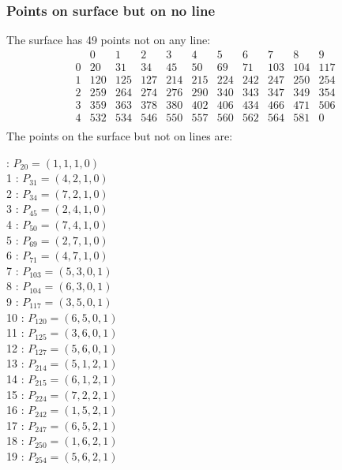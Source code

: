 \documentclass{article}
\begin{document}
{\subsubsection*{Points on surface but on no line}
The surface has 49 points not on any line:\\
$$
\begin{array}{r|*{10}{r}}
 & 0 & 1 & 2 & 3 & 4 & 5 & 6 & 7 & 8 & 9\\
\hline
0 & 20 & 31 & 34 & 45 & 50 & 69 & 71 & 103 & 104 & 117\\
1 & 120 & 125 & 127 & 214 & 215 & 224 & 242 & 247 & 250 & 254\\
2 & 259 & 264 & 274 & 276 & 290 & 340 & 343 & 347 & 349 & 354\\
3 & 359 & 363 & 378 & 380 & 402 & 406 & 434 & 466 & 471 & 506\\
4 & 532 & 534 & 546 & 550 & 557 & 560 & 562 & 564 & 581 & 0\\
\end{array}
$$
The points on the surface but not on lines are:\\
\begin{multicols}{2}
 : $P_{20}=( 1, 1, 1, 0 )$\\
1 : $P_{31}=( 4, 2, 1, 0 )$\\
2 : $P_{34}=( 7, 2, 1, 0 )$\\
3 : $P_{45}=( 2, 4, 1, 0 )$\\
4 : $P_{50}=( 7, 4, 1, 0 )$\\
5 : $P_{69}=( 2, 7, 1, 0 )$\\
6 : $P_{71}=( 4, 7, 1, 0 )$\\
7 : $P_{103}=( 5, 3, 0, 1 )$\\
8 : $P_{104}=( 6, 3, 0, 1 )$\\
9 : $P_{117}=( 3, 5, 0, 1 )$\\
10 : $P_{120}=( 6, 5, 0, 1 )$\\
11 : $P_{125}=( 3, 6, 0, 1 )$\\
12 : $P_{127}=( 5, 6, 0, 1 )$\\
13 : $P_{214}=( 5, 1, 2, 1 )$\\
14 : $P_{215}=( 6, 1, 2, 1 )$\\
15 : $P_{224}=( 7, 2, 2, 1 )$\\
16 : $P_{242}=( 1, 5, 2, 1 )$\\
17 : $P_{247}=( 6, 5, 2, 1 )$\\
18 : $P_{250}=( 1, 6, 2, 1 )$\\
19 : $P_{254}=( 5, 6, 2, 1 )$\\

\end{multicols}}
\end{document}
